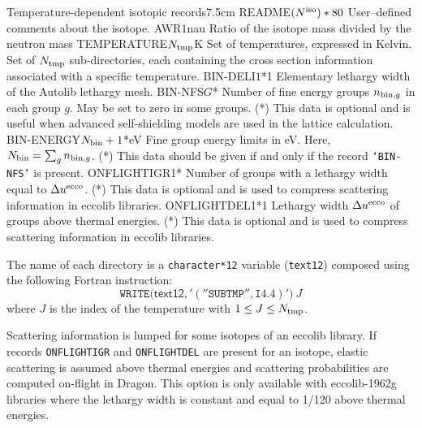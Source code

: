 \begin{DescriptionEnregistrement}{Temperature-dependent isotopic records}{7.5cm}
\label{tabl:tabiso201}
\CharEnr
  {README}{$(N^{\rm iso})*80$}
  {User--defined comments about the isotope.}
\RealEnr
  {AWR}{$1$}{nau}
  {Ratio of the isotope mass divided by the neutron mass}
\RealEnr
  {TEMPERATURE}{$N_{\rm tmp}$}{K}
  {Set of temperatures, expressed in Kelvin.}
\DirVar
  {}
  {Set of $N_{\rm tmp}$ sub-directories, each containing the cross section information
   associated with a specific temperature.}
\OptRealEnr
  {BIN-DELI}{$1$}{*}{1}
  {Elementary lethargy width of the Autolib lethargy mesh.}
\OptIntEnr
  {BIN-NFS}{$G$}{*}
  {Number of fine energy groups $n_{{\rm bin},g}$ in each group $g$. May be set to zero
  in some groups. (*) This data is optional and is useful when advanced self-shielding
  models are used in the lattice calculation.}
\OptRealEnr
  {BIN-ENERGY}{$N_{\rm bin}+1$}{*}{eV}
  {Fine group energy limits in eV. Here, $N_{\rm bin}=\sum_g n_{{\rm bin},g}$. (*) This data
  should be given if and only if the record {\tt `BIN-NFS'} is present.}
\OptIntEnr
  {ONFLIGHTIGR}{1}{*}
  {Number of groups with a lethargy width equal to $\Delta u^{\rm ecco}$. (*) This data is optional and is used to compress scattering information
  in eccolib libraries.}
\OptRealEnr
  {ONFLIGHTDEL}{1}{*}{1}
  {Lethargy width $\Delta u^{\rm ecco}$ of groups above thermal energies. (*) This data is optional and is used to compress scattering information
  in eccolib libraries.}
\end{DescriptionEnregistrement}

The name of each  directory is a {\tt character*12} variable ({\tt text12})
composed using the following Fortran instruction:
$$
\mathtt{WRITE(}\mathsf{text12}\mathtt{,'(''SUBTMP'',I4.4)')}\: J
$$
where $J$ is the index of the temperature with $1 \leq J \le N_{\rm tmp}$.

\vskip 0.2cm

Scattering information is lumped for some isotopes of an eccolib library. If records {\tt ONFLIGHTIGR} and
{\tt ONFLIGHTDEL} are present for an isotope, elastic scattering is assumed above thermal energies and
scattering probabilities are computed on-flight in Dragon. This option is only available with eccolib-1962g
libraries where the lethargy width is constant and equal to 1/120 above thermal energies.

\vskip 0.2cm

